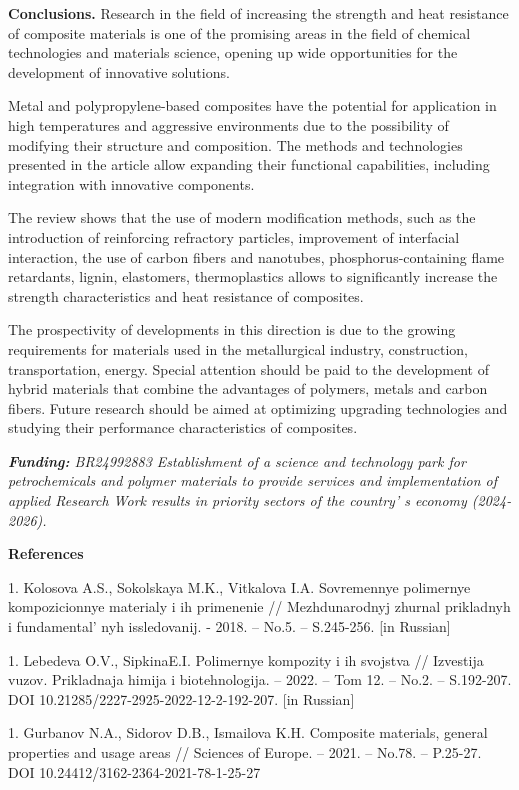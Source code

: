 {\bfseries Conclusions.} Research in the field of increasing the strength
and heat resistance of composite materials is one of the promising areas
in the field of chemical technologies and materials science, opening up
wide opportunities for the development of innovative solutions.

Metal and polypropylene-based composites have the potential for
application in high temperatures and aggressive environments due to the
possibility of modifying their structure and composition. The methods
and technologies presented in the article allow expanding their
functional capabilities, including integration with innovative
components.

The review shows that the use of modern modification methods, such as
the introduction of reinforcing refractory particles, improvement of
interfacial interaction, the use of carbon fibers and nanotubes,
phosphorus-containing flame retardants, lignin, elastomers,
thermoplastics allows to significantly increase the strength
characteristics and heat resistance of composites.

The prospectivity of developments in this direction is due to the
growing requirements for materials used in the metallurgical industry,
construction, transportation, energy. Special attention should be paid
to the development of hybrid materials that combine the advantages of
polymers, metals and carbon fibers. Future research should be aimed at
optimizing upgrading technologies and studying their performance
characteristics of composites.

\emph{{\bfseries Funding:} BR24992883 Establishment of a science and
technology park for petrochemicals and polymer materials to provide
services and implementation of applied Research Work results in priority
sectors of the country' s economy (2024-2026).}

{\bfseries References}


1. Kolosova A.S., Sokolskaya M.K., Vitkalova I.A. Sovremennye polimernye
kompozicionnye materialy i ih primenenie // Mezhdunarodnyj zhurnal
prikladnyh i fundamental' nyh issledovanij. - 2018. --
No.5. -- S.245-256. {[}in Russian{]}

1. Lebedeva O.V., SipkinaE.I. Polimernye kompozity i ih svojstva //
Izvestija vuzov. Prikladnaja himija i biotehnologija. -- 2022. -- Tom
12. -- No.2. -- S.192-207. DOI 10.21285/2227-2925-2022-12-2-192-207.
{[}in Russian{]}

1. Gurbanov N.A., Sidorov D.B., Ismailova K.H. Composite materials,
general properties and usage areas // Sciences of Europe. -- 2021. --
No.78. -- P.25-27. DOI 10.24412/3162-2364-2021-78-1-25-27

